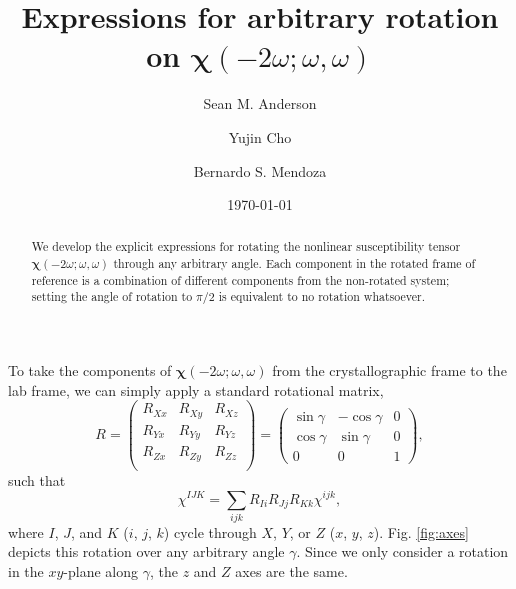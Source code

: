\documentclass[aps,prb,10pt,letterpaper,notitlepage]{revtex4-1}
\begin{document}
\title{Expressions for arbitrary rotation on
\texorpdfstring{$\boldsymbol{\chi}(-2\omega;\omega,\omega)$}{X(2w)}}
\author{Sean M. Anderson}
\author{Yujin Cho}
\author{Bernardo S. Mendoza}
\date{\today}

\begin{abstract}
We develop the explicit expressions for rotating the nonlinear susceptibility
tensor $\boldsymbol{\chi}(-2\omega;\omega,\omega)$ through any arbitrary angle.
Each component in the rotated frame of reference is a combination of different
components from the non-rotated system; setting the angle of rotation to $\pi/2$
is equivalent to no rotation whatsoever.
\end{abstract}

\maketitle

To take the components of $\boldsymbol{\chi}(-2\omega;\omega,\omega)$ from the
crystallographic frame to the lab frame, we can simply apply a standard
rotational matrix,
\begin{equation*}
R =
\begin{pmatrix}
R_{Xx} & R_{Xy} & R_{Xz} \\
R_{Yx} & R_{Yy} & R_{Yz} \\
R_{Zx} & R_{Zy} & R_{Zz} \\
\end{pmatrix}
=
\begin{pmatrix}
\sin\gamma & -\cos\gamma & 0 \\
\cos\gamma &  \sin\gamma & 0 \\
    0    &      0    & 1
\end{pmatrix},
\end{equation*}
such that
\begin{equation*}
\chi^{IJK} = \sum_{ijk}R_{Ii}R_{Jj}R_{Kk}\chi^{ijk},
\end{equation*}
where $I$, $J$, and $K$ ($i$, $j$, $k$) cycle through $X$, $Y$, or $Z$ ($x$,
$y$, $z$). Fig. \ref{fig:axes} depicts this rotation over any arbitrary angle
$\gamma$. Since we only consider a rotation in the $xy$-plane along $\gamma$,
the $z$ and $Z$ axes are the same.
\end{document}
